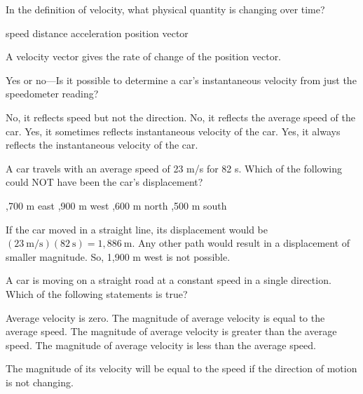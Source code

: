 \documentclass[]{exam}
\begin{document}
\begin{questions}
\begin{questions}
\question
In the definition of velocity, what physical quantity is changing over time?

\begin{choices}
\choice speed
\choice distance
\choice acceleration
\CorrectChoice position vector
\end{choices}

\begin{solution}
A velocity vector gives the rate of change of the position vector.
\end{solution}

\question
Yes or no---Is it possible to determine a car’s instantaneous velocity from just the speedometer reading?

\begin{choices}
\CorrectChoice No, it reflects speed but not the direction.
\choice No, it reflects the average speed of the car.
\choice Yes, it sometimes reflects instantaneous velocity of the car.
\choice Yes, it always reflects the instantaneous velocity of the car.
\end{choices}

\question
A car travels with an average speed of 23 m/s for 82 s. Which of the following could NOT have been the car's displacement?

\begin{choices}
,700 m east
,900 m west
,600 m north
,500 m south
\end{choices}

\begin{solution}
If the car moved in a straight line, its displacement would be $(23\ \mathrm{m/s})(82\ \mathrm{s}) = 1,886\ \mathrm{m}$. Any other path would result in a displacement of smaller magnitude. So, 1,900 m west is not possible.
\end{solution}

\question 
A car is moving on a straight road at a constant speed in a single direction. Which of the following statements is true?

\begin{choices}
\choice Average velocity is zero.
\CorrectChoice The magnitude of average velocity is equal to the average speed.
\choice The magnitude of average velocity is greater than the average speed.
\choice The magnitude of average velocity is less than the average speed.
\end{choices}

\begin{solution}
The magnitude of its velocity will be equal to the speed if the direction of motion is not changing.
\end{solution}



\end{questions}
\end{questions}
\end{document}
